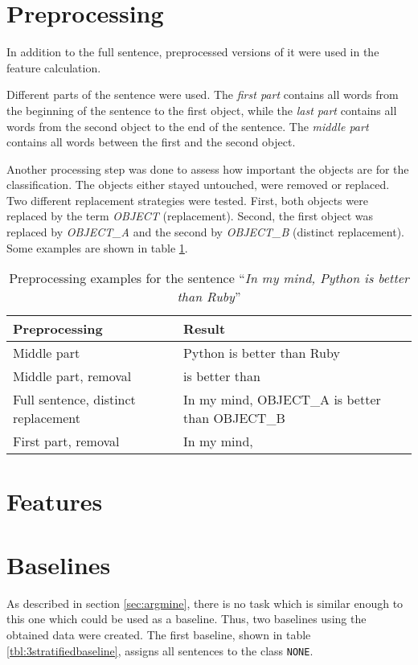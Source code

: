 \section{Preprocessing}
In addition to the full sentence, preprocessed versions of it were used in the feature calculation.

Different parts of the sentence were used. The \emph{first part} contains all words from the beginning of the sentence to the first object, while the \emph{last part} contains all words from the second object to the end of the sentence. The \emph{middle part} contains all words between the first and the second object.

Another processing step was done to assess how important the objects are for the classification. The objects either stayed untouched, were removed or replaced. Two different replacement strategies were tested. First, both objects were replaced by the term \emph{OBJECT} (replacement). Second, the first object was replaced by \emph{OBJECT\_A} and the second by \emph{OBJECT\_B} (distinct replacement). Some examples are shown in table \ref{preprocessing_example}.

\begin{table}[h]
\centering

\caption{Preprocessing examples for the sentence \enquote{\emph{In my mind, Python is better than Ruby}}}
\label{preprocessing_example}
\begin{tabularx}{\linewidth}{lX}
\toprule
Preprocessing & Result \\ \midrule
Middle part & Python is better than Ruby \\
Middle part, removal & is better than \\
Full sentence, distinct replacement &In my mind, OBJECT\_A is better than OBJECT\_B \\
First part, removal & In my mind, \\
\bottomrule
\end{tabularx}

\end{table}


\section{Features}

\section{Baselines}
\label{sec:3_baseline}
As described in section \ref{sec:argmine}, there is no task which is similar enough to this one which could be used as a baseline. Thus, two baselines using the obtained data were created. The first baseline, shown in table \ref{tbl:3stratifiedbaseline}, assigns all sentences to the class \texttt{NONE}.

